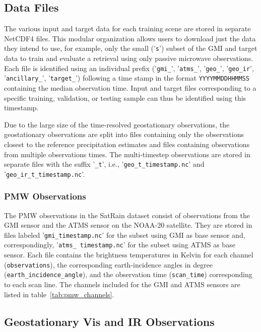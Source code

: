 \documentclass[11pt]{article}
\begin{document}
\subsection{Data Files}

The various input and target data for each training scene are stored in separate
NetCDF4 files. This modular organization allows users to download just the data
they intend to use, for example, only the small ('\texttt{s}') subset of the GMI
and target data to train and evaluate a retrieval using only passive microwave
observations. Each file is identified using an individual prefix
('\texttt{gmi\_}', '\texttt{atms\_}', '\texttt{geo\_}', '\texttt{geo\_ir}',
'\texttt{ancillary\_}', '\texttt{target\_}') following a time stamp in the format
\texttt{YYYYMMDDHHMMSS} containing the median observation time. Input and target
files corresponding to a specific training, validation, or testing sample can
thus be identified using this timestamp.

Due to the large size of the time-resolved geostationary observations, the
geostationary observations are split into files containing only the observations
closest to the reference precipitation estimates and files containing
observations from multiple observations times. The multi-timestep observations
are stored in separate files with the suffix '\texttt{\_t}', i.e.,
'\texttt{geo\_t\_\textlangle timestamp\textrangle.nc}' and '\texttt{geo\_ir\_t\_\textlangle timestamp\textrangle.nc}'.

\subsubsection{PMW Observations}

The PMW observations in the SatRain dataset consist of observations from the GMI
sensor and the ATMS sensor on the NOAA-20 satellite. They are stored in files
labeled '\texttt{gmi\_\textlangle timestamp\textrangle.nc}' for the subset using
GMI as base sensor and, correspondingly, '\texttt{atms\_\textlangle
  timestamp\textrangle.nc}' for the subset using ATMS as base sensor. Each file
contains the brightness temperatures in Kelvin for each channel
(\texttt{observations}), the corresponding earth-incidence angles in degree
(\texttt{earth\_incidence\_angle}), and the observation time
(\texttt{scan\_time}) corresponding to each scan line. The channels included for
the GMI and ATMS sensors are listed in table~\ref{tab:pmw_channels}.

\subsection{Geostationary Vis and IR Observations}
\end{document}
